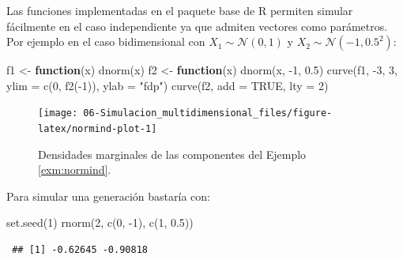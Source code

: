 \documentclass[
  10pt,
]{book}
\newenvironment{Shaded}{\begin{snugshade}}{\end{snugshade}}
\newcommand{\AttributeTok}[1]{\textcolor[rgb]{0.77,0.63,0.00}{#1}}
\newcommand{\ConstantTok}[1]{\textcolor[rgb]{0.00,0.00,0.00}{#1}}
\newcommand{\ControlFlowTok}[1]{\textcolor[rgb]{0.13,0.29,0.53}{\textbf{#1}}}
\newcommand{\DecValTok}[1]{\textcolor[rgb]{0.00,0.00,0.81}{#1}}
\newcommand{\FloatTok}[1]{\textcolor[rgb]{0.00,0.00,0.81}{#1}}
\newcommand{\FunctionTok}[1]{\textcolor[rgb]{0.00,0.00,0.00}{#1}}
\newcommand{\NormalTok}[1]{#1}
\newcommand{\OtherTok}[1]{\textcolor[rgb]{0.56,0.35,0.01}{#1}}
\newcommand{\SpecialCharTok}[1]{\textcolor[rgb]{0.00,0.00,0.00}{#1}}
\newcommand{\StringTok}[1]{\textcolor[rgb]{0.31,0.60,0.02}{#1}}
\theoremstyle{break}
\theoremstyle{nonumberplain}
\begin{document}
Las funciones implementadas en el paquete base de R permiten simular fácilmente en el caso independiente ya que admiten vectores como parámetros.
Por ejemplo en el caso bidimensional con \(X_1 \sim \mathcal{N}\left( 0, 1\right)\) y \(X_2 \sim \mathcal{N}\left( -1, 0.5^2 \right)\):



\begin{Shaded}
\begin{Highlighting}[]
\NormalTok{f1 }\OtherTok{\textless{}{-}} \ControlFlowTok{function}\NormalTok{(x) }\FunctionTok{dnorm}\NormalTok{(x)}
\NormalTok{f2 }\OtherTok{\textless{}{-}} \ControlFlowTok{function}\NormalTok{(x) }\FunctionTok{dnorm}\NormalTok{(x, }\SpecialCharTok{{-}}\DecValTok{1}\NormalTok{, }\FloatTok{0.5}\NormalTok{)}
\FunctionTok{curve}\NormalTok{(f1, }\SpecialCharTok{{-}}\DecValTok{3}\NormalTok{, }\DecValTok{3}\NormalTok{, }\AttributeTok{ylim =} \FunctionTok{c}\NormalTok{(}\DecValTok{0}\NormalTok{, }\FunctionTok{f2}\NormalTok{(}\SpecialCharTok{{-}}\DecValTok{1}\NormalTok{)), }\AttributeTok{ylab =} \StringTok{"fdp"}\NormalTok{)}
\FunctionTok{curve}\NormalTok{(f2, }\AttributeTok{add =} \ConstantTok{TRUE}\NormalTok{, }\AttributeTok{lty =} \DecValTok{2}\NormalTok{)}
\end{Highlighting}
\end{Shaded}

\begin{figure}[!htbp]

{\centering \texttt{[image: 06-Simulacion\_multidimensional\_files/figure-latex/normind-plot-1]} 

}

\caption{Densidades marginales de las componentes del Ejemplo \ref{exm:normind}.}\label{fig:normind-plot}
\end{figure}

Para simular una generación bastaría con:

\begin{Shaded}
\begin{Highlighting}[]
\FunctionTok{set.seed}\NormalTok{(}\DecValTok{1}\NormalTok{)}
\FunctionTok{rnorm}\NormalTok{(}\DecValTok{2}\NormalTok{, }\FunctionTok{c}\NormalTok{(}\DecValTok{0}\NormalTok{, }\SpecialCharTok{{-}}\DecValTok{1}\NormalTok{), }\FunctionTok{c}\NormalTok{(}\DecValTok{1}\NormalTok{, }\FloatTok{0.5}\NormalTok{))}
\end{Highlighting}
\end{Shaded}

\begin{verbatim}
 ## [1] -0.62645 -0.90818
\end{verbatim}
\end{document}
